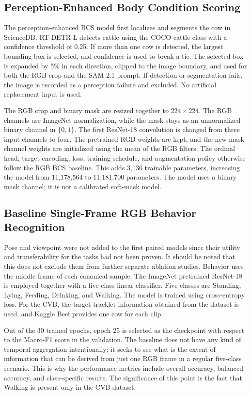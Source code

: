 \subsection{Perception-Enhanced Body Condition Scoring}

The perception-enhanced BCS model first localizes and segments the cow in ScienceDB. RT-DETR-L detects cattle using the COCO cattle class with a confidence threshold of 0.25. If more than one cow is detected, the largest bounding box is selected, and confidence is used to break a tie. The selected box is expanded by 5\% in each direction, clipped to the image boundary, and used for both the RGB crop and the SAM 2.1 prompt. If detection or segmentation fails, the image is recorded as a perception failure and excluded. No artificial replacement input is used.

The RGB crop and binary mask are resized together to $224\times224$. The RGB channels use ImageNet normalization, while the mask stays as an unnormalized binary channel in $\{0,1\}$. The first ResNet-18 convolution is changed from three input channels to four. The pretrained RGB weights are kept, and the new mask-channel weights are initialized using the mean of the RGB filters. The ordinal head, target encoding, loss, training schedule, and augmentation policy otherwise follow the RGB BCS baseline. This adds 3,136 trainable parameters, increasing the model from 11,178,564 to 11,181,700 parameters. The model uses a binary mask channel; it is not a calibrated soft-mask model.

\subsection{Baseline Single-Frame RGB Behavior Recognition}

Pose and viewpoint were not added to the first paired models since their utility and transferability for the tasks had not been proven. It should be noted that this does not exclude them from further separate ablation studies. Behavior uses the middle frame of each canonical sample. The ImageNet pretrained ResNet-18 is employed together with a five-class linear classifier. Five classes are Standing, Lying, Feeding, Drinking, and Walking. The model is trained using cross-entropy loss. For the CVB, the target tracklet information obtained from the dataset is used, and Kaggle Beef provides one cow for each clip.

Out of the 30 trained epochs, epoch 25 is selected as the checkpoint with respect to the Macro-F1 score in the validation. The baseline does not have any kind of temporal aggregation intentionally; it seeks to see what is the extent of information that can be derived from just one RGB frame in a regular five-class scenario. This is why the performance metrics include overall accuracy, balanced accuracy, and class-specific results. The significance of this point is the fact that Walking is present only in the CVB dataset.

